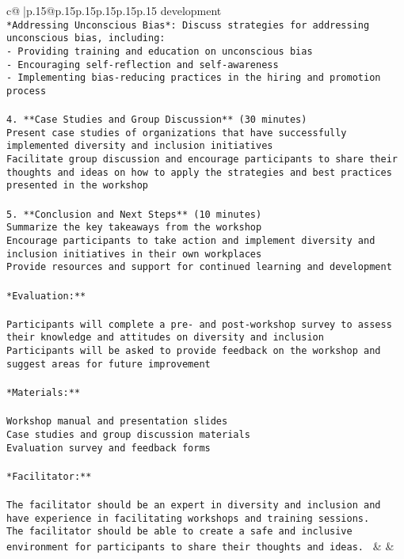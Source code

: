\documentclass{article}
\begin{document}
{\begin{supertabular}{c@{$\;$}|p{.15\linewidth}@{}p{.15\linewidth}p{.15\linewidth}p{.15\linewidth}p{.15\linewidth}p{.15\linewidth}}
{{{development\\ \tt    * *Addressing Unconscious Bias*: Discuss strategies for addressing unconscious bias, including:\\ \tt      - Providing training and education on unconscious bias\\ \tt      - Encouraging self-reflection and self-awareness\\ \tt      - Implementing bias-reducing practices in the hiring and promotion process\\ \tt \\ \tt 4. **Case Studies and Group Discussion** (30 minutes)\\ \tt    * Present case studies of organizations that have successfully implemented diversity and inclusion initiatives\\ \tt    * Facilitate group discussion and encourage participants to share their thoughts and ideas on how to apply the strategies and best practices presented in the workshop\\ \tt \\ \tt 5. **Conclusion and Next Steps** (10 minutes)\\ \tt    * Summarize the key takeaways from the workshop\\ \tt    * Encourage participants to take action and implement diversity and inclusion initiatives in their own workplaces\\ \tt    * Provide resources and support for continued learning and development\\ \tt \\ \tt **Evaluation:**\\ \tt \\ \tt * Participants will complete a pre- and post-workshop survey to assess their knowledge and attitudes on diversity and inclusion\\ \tt * Participants will be asked to provide feedback on the workshop and suggest areas for future improvement\\ \tt \\ \tt **Materials:**\\ \tt \\ \tt * Workshop manual and presentation slides\\ \tt * Case studies and group discussion materials\\ \tt * Evaluation survey and feedback forms\\ \tt \\ \tt **Facilitator:**\\ \tt \\ \tt * The facilitator should be an expert in diversity and inclusion and have experience in facilitating workshops and training sessions.\\ \tt * The facilitator should be able to create a safe and inclusive environment for participants to share their thoughts and ideas. 
	  } 
	   } 
	   } 
	 & & \\ 
 


\end{supertabular}}
\end{document}
